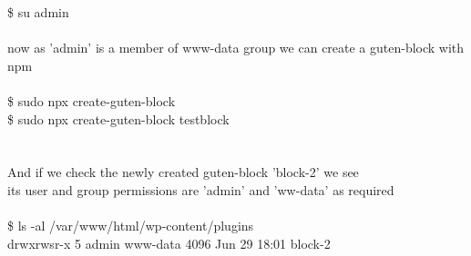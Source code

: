 \documentclass[10pt,a4paper]{article}
\begin{document}
{{{{{{{{{{{{{{{{{{{{{\$ su admin\\
\\
now as 'admin' is a member of www-data group we can create a guten-block with npm\\
\\
\$ sudo npx create-guten-block\\
\$ sudo npx create-guten-block testblock\\
\\
\\
And if we check the newly created guten-block 'block-2' we see \\
its user and group permissions are 'admin' and 'ww-data' as required\\
\\
\$ ls -al /var/www/html/wp-content/plugins}{\large \\
drwxrwsr-x 5    admin       www-data    4096 Jun 29 18:01 block-2\\
\\
\\
\\
\\
\\
\\
\\
\\
\\
\\
\\
\\
\\
\\
\\
\\
\\
\\
\\
\\
\\
\\
\\
\\
\\
\\
\\
\\
\\
\\
\\
\\
\\
\\
\\
\\
\\
\\
}}}}}}}}}}}}}}}}}}}}}
\end{document}
